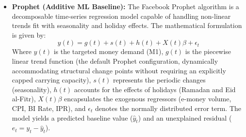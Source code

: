 \documentclass[12pt, letterpaper]{article}
\begin{document}
\begin{itemize}
    \item \textbf{Prophet (Additive ML Baseline):} The Facebook Prophet algorithm is a decomposable time-series regression model capable of handling non-linear trends fit with seasonality and holiday effects. The mathematical formulation is given by:
    \begin{equation}
        y(t) = g(t) + s(t) + h(t) + X(t)\beta + \epsilon_t
    \end{equation}
    Where $y(t)$ is the targeted money demand (M1), $g(t)$ is the piecewise linear trend function (the default Prophet configuration, dynamically accommodating structural change points without requiring an explicitly capped carrying capacity), $s(t)$ represents the periodic changes (seasonality), $h(t)$ accounts for the effects of holidays (Ramadan and Eid al-Fitr), $X(t)\beta$ encapsulates the exogenous regressors (e-money volume, CPI, BI Rate, IPR), and $\epsilon_t$ denotes the normally distributed error term. The model yields a predicted baseline value ($\hat{y}_t$) and an unexplained residual ($e_t = y_t - \hat{y}_t$).
    

\end{itemize}
\end{document}
